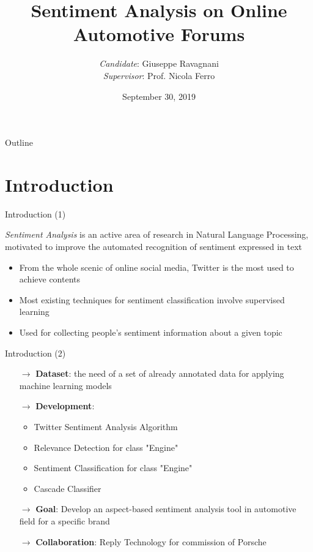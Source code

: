 \documentclass{beamer}
\title{Sentiment Analysis on Online Automotive Forums}
\author[me]{\textit{Candidate}: Giuseppe Ravagnani\\\textit{Supervisor}: Prof. Nicola Ferro\\[5mm]}
\date{September 30, 2019}
\begin{document}
	\maketitle

	\begin{frame}{Outline}
		\tableofcontents
	\end{frame}


	\section{Introduction}

	\begin{frame}{Introduction (1)}

		\textit{Sentiment Analysis} is an active area of research in Natural Language Processing, motivated to improve the automated recognition of sentiment expressed in text \vspace{.5em}

		\begin{itemize}
			\item From the whole scenic of online social media, Twitter is the most used to achieve
			contents \vspace{.5em}
			\item Most existing techniques for sentiment classification involve supervised learning \vspace{.5em}
			\item Used for collecting people's sentiment information about a given topic
		\end{itemize}
	\end{frame}

	\begin{frame}{Introduction (2)}
		
		\begin{itemize}
			\item[$\rightarrow$] \textbf{Dataset}: the need of a set of already annotated data for applying machine learning models
			\item[$\rightarrow$] \textbf{Development}:
				\begin{itemize}
					\item Twitter Sentiment Analysis Algorithm
					\item Relevance Detection for class "Engine"
					\item Sentiment Classification for class "Engine"
					\item Cascade Classifier
				\end{itemize}
			\item[$\rightarrow$] \textbf{Goal}: Develop an aspect-based sentiment analysis tool in automotive field for a specific brand	
			\item[$\rightarrow$] \textbf{Collaboration}: Reply Technology for commission of Porsche
		\end{itemize}
	
	\end{frame}
\end{document}
